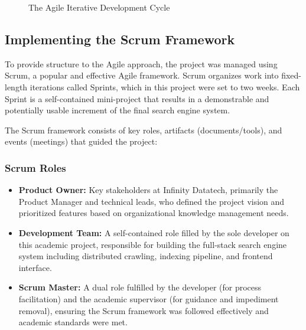 \documentclass{report}
\begin{document}
\begin{figure}[H]
\centering
{}
\caption{The Agile Iterative Development Cycle}
\label{fig:agile_cycle}
\end{figure}


\subsection{Implementing the Scrum Framework}
To provide structure to the Agile approach, the project was managed using Scrum, a popular and effective Agile framework. Scrum organizes work into fixed-length iterations called Sprints, which in this project were set to two weeks. Each Sprint is a self-contained mini-project that results in a demonstrable and potentially usable increment of the final search engine system.

The Scrum framework consists of key roles, artifacts (documents/tools), and events (meetings) that guided the project:

\subsubsection{Scrum Roles}
\begin{itemize}
\item \textbf{Product Owner:} Key stakeholders at Infinity Datatech, primarily the Product Manager and technical leads, who defined the project vision and prioritized features based on organizational knowledge management needs.
\item \textbf{Development Team:} A self-contained role filled by the sole developer on this academic project, responsible for building the full-stack search engine system including distributed crawling, indexing pipeline, and frontend interface.
\item \textbf{Scrum Master:} A dual role fulfilled by the developer (for process facilitation) and the academic supervisor (for guidance and impediment removal), ensuring the Scrum framework was followed effectively and academic standards were met.
\end{itemize}
\end{document}
